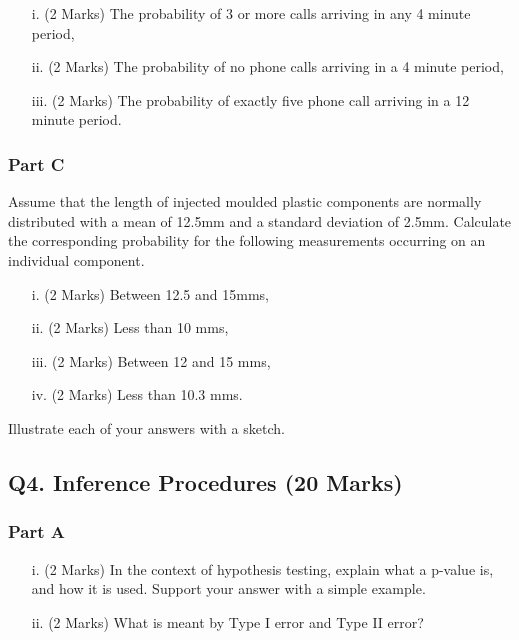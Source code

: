 \documentclass[a4paper,12pt]{article}
\begin{document}
\begin{itemize}
\item [i.](2 Marks)	The probability of 3 or more calls arriving in any 4 minute period,
\item [ii.](2 Marks) The probability of no phone calls arriving in a 4 minute period,
\item [iii.](2 Marks) The probability of exactly five phone call arriving in a 12 minute period.

\end{itemize}
\subsubsection*{Part C} %
Assume that the length of injected moulded plastic components are normally distributed with a mean of 12.5mm and a standard deviation of 2.5mm.  Calculate the corresponding probability for the following measurements occurring on an individual component.

\begin{itemize}
\item [i.](2 Marks)	Between 12.5 and 15mms,
\item [ii.](2 Marks) Less than 10 mms,
\item [iii.](2 Marks) Between 12 and 15 mms,
\item [iv.](2 Marks) Less than 10.3 mms.
\end{itemize}
\noindent Illustrate each of your answers with a sketch.
\newpage


\subsection*{Q4. Inference Procedures (20 Marks)}

\subsubsection*{Part A} %
\begin{itemize}
\item[i.](2 Marks) In the context of hypothesis testing, explain what a p-value is, and how it is used. Support your answer with a simple example.
\item[ii.](2 Marks) What is meant by Type I error and Type II error?
\end{itemize}
\end{document}

